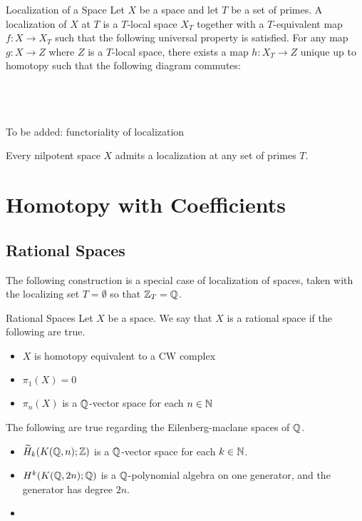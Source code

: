 \documentclass[a4paper]{article}
\begin{document}
\begin{defn}{Localization of a Space}{} Let $X$ be a space and let $T$ be a set of primes. A localization of $X$ at $T$ is a $T$-local space $X_T$ together with a $T$-equivalent map $f:X\to X_T$ such that the following universal property is satisfied. For any map $g:X\to Z$ where $Z$ is a $T$-local space, there exists a map $h:X_T\to Z$ unique up to homotopy such that the following diagram commutes: \\~\\
\\~\\
\end{defn}

To be added: functoriality of localization

\begin{thm}{}{} Every nilpotent space $X$ admits a localization at any set of primes $T$. 
\end{thm}

\pagebreak
\section{Homotopy with Coefficients}
\subsection{Rational Spaces}
The following construction is a special case of localization of spaces, taken with the localizing set $T=\emptyset$ so that $\mathbb{Z}_T=\mathbb{Q}$. 

\begin{defn}{Rational Spaces}{} Let $X$ be a space. We say that $X$ is a rational space if the following are true. 
\begin{itemize}
\item $X$ is homotopy equivalent to a CW complex
\item $\pi_1(X)=0$
\item $\pi_n(X)$ is a $\mathbb{Q}$-vector space for each $n\in\mathbb{N}$
\end{itemize}
\end{defn}

\begin{lmm}{}{} The following are true regarding the Eilenberg-maclane spaces of $\mathbb{Q}$. 
\begin{itemize}
\item $\widetilde{H}_k(K(\mathbb{Q},n);\mathbb{Z})$ is a $\mathbb{Q}$-vector space for each $k\in\mathbb{N}$. 
\item $H^k(K(\mathbb{Q},2n);\mathbb{Q})$ is a $\mathbb{Q}$-polynomial algebra on one generator, and the generator has degree $2n$. 
\item 
\end{itemize}
\end{lmm}
\end{document}
